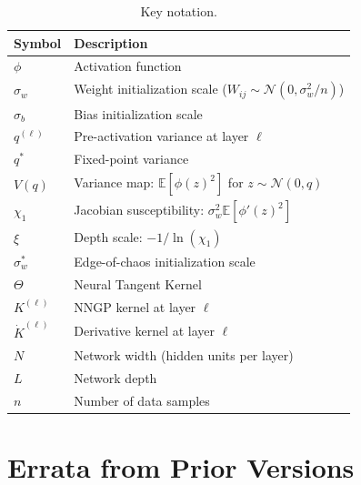 \documentclass[10pt]{article}
\theoremstyle{definition}
\begin{document}
\begin{table}[H]
\centering
\caption{Key notation.}
\begin{tabular}{lp{10cm}}
\toprule
Symbol & Description \\
\midrule
$\phi$ & Activation function \\
$\sigma_w$ & Weight initialization scale ($W_{ij} \sim \mathcal{N}(0, \sigma_w^2/n)$) \\
$\sigma_b$ & Bias initialization scale \\
$q^{(\ell)}$ & Pre-activation variance at layer $\ell$ \\
$q^*$ & Fixed-point variance \\
$V(q)$ & Variance map: $\mathbb{E}[\phi(z)^2]$ for $z \sim \mathcal{N}(0,q)$ \\
$\chi_1$ & Jacobian susceptibility: $\sigma_w^2 \mathbb{E}[\phi'(z)^2]$ \\
$\xi$ & Depth scale: $-1/\ln(\chi_1)$ \\
$\sigma_w^*$ & Edge-of-chaos initialization scale \\
$\Theta$ & Neural Tangent Kernel \\
$K^{(\ell)}$ & NNGP kernel at layer $\ell$ \\
$\dot{K}^{(\ell)}$ & Derivative kernel at layer $\ell$ \\
$N$ & Network width (hidden units per layer) \\
$L$ & Network depth \\
$n$ & Number of data samples \\
\bottomrule
\end{tabular}
\end{table}

\section{Errata from Prior Versions}
\label{app:errata}
\end{document}
